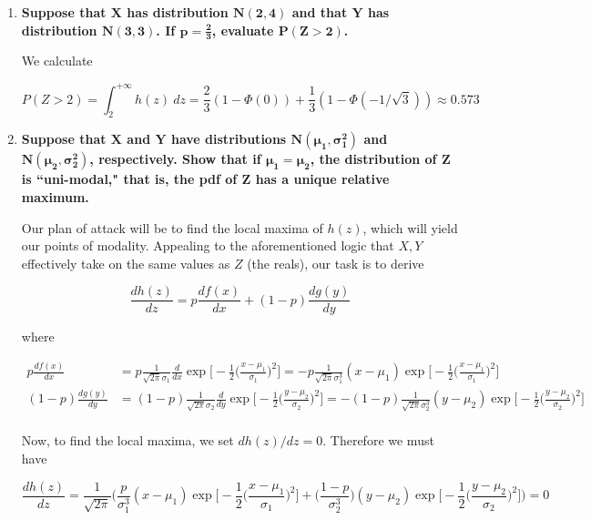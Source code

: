 \documentclass[10pt, oneside]{article}
\begin{document}
\begin{enumerate}[label=9.\arabic*]
\begin{enumerate}
	\item  \begin{tcolorbox}[
	  colback=Cerulean!5!white,
	  colframe=Cerulean!75!black]
	\textbf{Suppose that $\bm{X}$ has distribution $\bm{N(2,4)}$ and that $\bm{Y}$ has distribution $\bm{N(3,3)}$. If $\bm{p = \frac{2}{3}}$, evaluate $\bm{P(Z > 2)}$.}
	\end{tcolorbox}
	
	We calculate
	
	\[ P(Z > 2) = \int^{+\infty}_2 h(z) \ dz = \frac{2}{3} (1 - \Phi(0)) + \frac{1}{3} (1 - \Phi(- 1/\sqrt{3})) \approx \boxed{0.573} \]
	
	\item  \begin{tcolorbox}[
	  colback=Cerulean!5!white,
	  colframe=Cerulean!75!black]
	\textbf{Suppose that $\bm{X}$ and $\bm{Y}$ have distributions $\bm{N(\mu_1, \sigma^2_1)}$ and $\bm{N(\mu_2, \sigma^2_2)}$, respectively. Show that if $\bm{\mu_1 = \mu_2}$, the distribution of $\bm{Z}$ is ``uni-modal," that is, the pdf of $\bm{Z}$ has a unique relative maximum.}
	\end{tcolorbox}
	
	Our plan of attack will be to find the local maxima of $h(z)$, which will yield our points of modality. Appealing to the aforementioned logic that $X, Y$ effectively take on the same values as $Z$ (the reals), our task is to derive
	
	\[ \frac{d h(z)}{dz} = p \frac{d f(x)}{dx} + (1-p) \frac{d g(y)}{dy} \]
	
	where
	
	\begin{align*}
	p \frac{d f(x)}{dx} &= p \frac{1}{\sqrt{2\pi} \sigma_1} \frac{d}{dx} \exp \bigg[ -\frac{1}{2} \bigg( \frac{x-\mu_1}{\sigma_1} \bigg)^2 \bigg] = -p \frac{1}{\sqrt{2\pi} \sigma^3_1} (x-\mu_1) \exp  \bigg[ -\frac{1}{2} \bigg( \frac{x-\mu_1}{\sigma_1} \bigg)^2 \bigg] \\
	(1-p) \frac{d g(y)}{dy} &= (1-p) \frac{1}{\sqrt{2\pi} \sigma_2} \frac{d}{dy} \exp \bigg[ -\frac{1}{2} \bigg( \frac{y-\mu_2}{\sigma_2} \bigg)^2 \bigg] = -(1-p) \frac{1}{\sqrt{2\pi} \sigma^3_2} (y-\mu_2) \exp  \bigg[ -\frac{1}{2} \bigg( \frac{y-\mu_2}{\sigma_2} \bigg)^2 \bigg] \\
	\end{align*}
	
	Now, to find the local maxima, we set $dh(z) / dz = 0$. Therefore we must have
	
	\[ \frac{d h(z)}{dz} = \frac{1}{\sqrt{2\pi}} \bigg( \frac{p}{ \sigma^3_1} (x-\mu_1) \exp  \bigg[ -\frac{1}{2} \bigg( \frac{x-\mu_1}{\sigma_1} \bigg)^2 \bigg] + \bigg( \frac{1-p}{ \sigma^3_2} \bigg) (y-\mu_2) \exp  \bigg[ -\frac{1}{2} \bigg( \frac{y-\mu_2}{\sigma_2} \bigg)^2 \bigg] \bigg) = 0 \]
	

\end{enumerate}
\end{enumerate}
\end{document}
